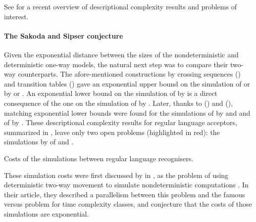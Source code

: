 See \cite{KutMor+21} for a recent overview of descriptional complexity results and problems of interest.

\paragraph{The Sakoda and Sipser conjecture} Given the exponential distance between the sizes of the nondeterministic and deterministic one-way models, the natural next step was to compare their two-way counterparts.
The afore-mentioned constructions by crossing sequences (\cite{RabSco59}) and transition tables (\cite{She59}) gave an exponential upper bound on the simulation of \TNFA or \TDFA by \ONFA or \ODFA.
An exponential lower bound on the simulation of \TNFA by \ODFA is a direct consequence of the one on the simulation of \ONFA by \ODFA.
Later, thanks to \citeauthor{Bir93} (\citeyear{Bir93}) and \citeauthor{Kap05} (\citeyear{Kap05}), matching exponential lower bounds were found for the simulations of \TDFA by \ONFA and \ODFA and of \TNFA by \ONFA \cite{Bir93,Kap05}.
These descriptional complexity results for regular language acceptors, summarized in , leave only two open problems (highlighted in red): the simulations by \TDFA of \TNFA and \ONFA.

\begin{table}
	\centering
	\caption{Costs of the simulations between regular language recognisers.}
	\label{tab:sims-core-general-context}
\end{table}

These simulation costs were first discussed by \citeauthor{SakSip78} in \citeyear{SakSip78}, as the problem of using deterministic two-way movement to simulate nondeterministic computations \cite{SakSip78}.
In their article, they described a parallelism between this problem and the famous \cP versus \cNP problem for time complexity classes, and conjecture that the costs of those simulations are exponential.

